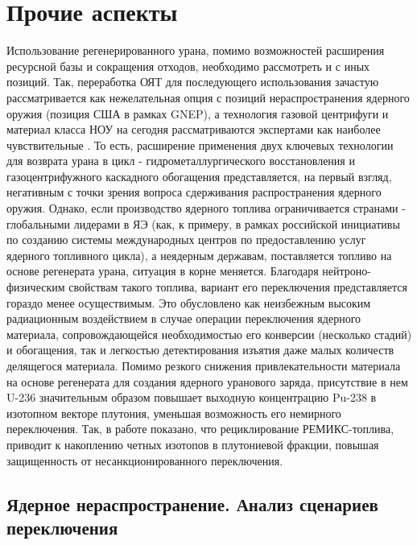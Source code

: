 \section{Прочие аспекты}\label{sec:ch2/sec4}

Использование регенерированного урана, помимо возможностей расширения ресурсной базы и сокращения отходов, необходимо рассмотреть и с иных позиций. Так, переработка ОЯТ для последующего использования зачастую рассматривается как нежелательная опция с позиций нераспространения ядерного оружия (позиция США в рамках GNEP), а технология газовой центрифуги и материал класса НОУ на сегодня рассматриваются экспертами как наиболее чувствительные \cite{nevinicaPovyshenieZashchishchennostiEksportnyh}. То есть, расширение применения двух ключевых технологии для возврата урана в цикл - гидрометаллургического восстановления и газоцентрифужного каскадного обогащения представляется, на первый взгляд, негативным с точки зрения вопроса сдерживания распространения ядерного оружия. Однако, если производство ядерного топлива ограничивается странами - глобальными лидерами в ЯЭ (как, к примеру, в рамках российской инициативы по созданию системы международных центров по предоставлению услуг ядерного топливного цикла), а неядерным державам, поставляется топливо на основе регенерата урана, ситуация в корне меняется. Благодаря нейтроно-физическим свойствам такого топлива, вариант его переключения представляется гораздо менее осуществимым. Это обусловлено как неизбежным высоким радиационным воздействием в случае операции переключения ядерного материала, сопровождающейся необходимостью его конверсии (несколько стадий) и обогащения, так и легкостью детектирования изъятия даже малых количеств делящегося материала. Помимо резкого снижения привлекательности материала на основе регенерата для создания ядерного уранового заряда, присутствие в нем U-236 значительным образом повышает выходную концентрацию Pu-238 в изотопном векторе плутония, уменьшая возможность его немирного переключения. Так, в работе \cite{solovevAnalizYadernogoToplivnogo2019} показано, что рециклирование РЕМИКС-топлива, приводит к накоплению четных изотопов в плутониевой фракции, повышая защищенность от несанкционированного переключения.


\subsection{Ядерное нераспространение. Анализ сценариев переключения}\label{sec:ch2/sec4.1}


